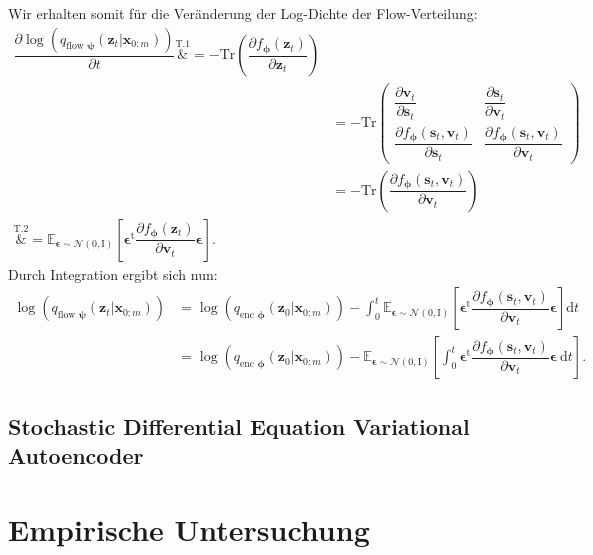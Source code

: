 \documentclass[12pt]{article}
\newcommand{\E}{\mathbb{E}}
\begin{document}
	Wir erhalten somit für die Veränderung der Log-Dichte der Flow-Verteilung:
	\begin{align*}
	\dfrac{\partial \log\left(q_{\text{flow }\boldsymbol\psi}(\mathbf{z}_{t}|\mathbf{x}_{0:m})\right)}{\partial t}\overset{\text{T.1}}&{=} - \text{Tr}\left(\dfrac{\partial f_{\boldsymbol\phi}(\mathbf{z}_{t})}{\partial\mathbf{z}_{t}}\right) \\ &=
	- \text{Tr} \left(\begin{array}{cc} 
	\dfrac{\partial\mathbf{v}_{t}}{\partial\mathbf{s}_{t}} & 
	\dfrac{\partial\mathbf{s}_{t}}{\partial\mathbf{v}_{t}}\\ 
	\dfrac{\partial f_{\boldsymbol\phi}(\mathbf{s}_{t},\mathbf{v}_{t})}{\partial\mathbf{s}_{t}} & 
	\dfrac{\partial f_{\boldsymbol\phi}(\mathbf{s}_{t},\mathbf{v}_{t})}{\partial\mathbf{v}_{t}}  
	\end{array}\right)\\
	&=
	-\text{Tr}\left(\dfrac{\partial f_{\boldsymbol\phi}(\mathbf{s}_{t},\mathbf{v}_{t})}{\partial\mathbf{v}_{t}}\right)\\
	\overset{\text{T.2}}&{=} \E_{\boldsymbol\epsilon\sim\mathcal{N}(0,\text{I})}\left[\boldsymbol\epsilon^\mathrm{t}\dfrac{\partial f_{\boldsymbol\phi}(\mathbf{z}_{t})}{\partial\mathbf{v}_{t}}\boldsymbol\epsilon\right].
	\end{align*}		
	Durch Integration ergibt sich nun:
	\begin{align*}
	\log\left(q_{\text{flow }\boldsymbol\psi}(\mathbf{z}_{t}|\mathbf{x}_{0:m})\right)&=\log\left(q_{\text{enc }\boldsymbol\phi}(\mathbf{z}_{0}|\mathbf{x}_{0:m})\right)-\int_0^t \E_{\boldsymbol\epsilon\sim\mathcal{N}(0,\text{I})}\left[\boldsymbol\epsilon^\mathrm{t}\dfrac{\partial f_{\boldsymbol\phi}(\mathbf{s}_{t},\mathbf{v}_{t})}{\partial\mathbf{v}_{t}}\boldsymbol\epsilon\right]\text{d}t\\
	&= \log\left(q_{\text{enc }\boldsymbol\phi}(\mathbf{z}_{0}|\mathbf{x}_{0:m})\right)-\E_{\boldsymbol\epsilon\sim\mathcal{N}(0,\text{I})}\left[\int_0^t \boldsymbol\epsilon^\mathrm{t}\dfrac{\partial f_{\boldsymbol\phi}(\mathbf{s}_{t},\mathbf{v}_{t})}{\partial\mathbf{v}_{t}}\boldsymbol\epsilon\ \text{d}t\right].
	\end{align*}		
	
	\subsection[SDE-VAE]{Stochastic Differential Equation Variational Autoencoder}

	
	\section[Empirische Untersuchung]{Empirische Untersuchung}
\end{document}
